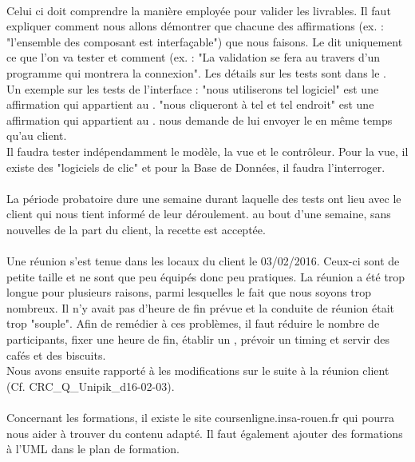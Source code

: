 \documentclass [a4paper] {article}
\begin{document}
\paragraph{}
Celui ci doit comprendre la manière employée pour valider les livrables. Il faut expliquer comment nous allons démontrer que chacune des affirmations (ex. : "l'ensemble des composant est interfaçable") que nous faisons. Le \PTVCourt{} dit uniquement ce que l'on va tester et comment (ex. : "La validation se fera au travers d'un programme qui montrera la connexion". Les détails sur les tests sont dans le \CDR{}.
\\
Un exemple sur les tests de l'interface : "nous utiliserons tel logiciel" est une affirmation qui appartient au \PTVCourt{}. "nous cliqueront à tel et tel endroit" est une affirmation qui appartient au \CDR{}. \nomTuteurPedago{} nous demande de lui envoyer le \PTV{} en même temps qu'au client.
\\
Il faudra tester indépendamment le modèle, la vue et le contrôleur. Pour la vue, il existe des "logiciels de clic" et pour la Base de Données, il faudra l'interroger.
\paragraph{}
La période probatoire dure une semaine durant laquelle des tests ont lieu avec le client qui nous tient informé de leur déroulement. au bout d'une semaine, sans nouvelles de la part du client, la recette est acceptée.
\paragraph{}
Une réunion s'est tenue dans les locaux du client le 03/02/2016. Ceux-ci sont de petite taille et ne sont que peu équipés donc peu pratiques. La réunion a été trop longue pour plusieurs raisons, parmi lesquelles le fait que nous soyons trop nombreux. Il n'y avait pas d'heure de fin prévue et la conduite de réunion était trop "souple". Afin de remédier à ces problèmes, il faut réduire le nombre de participants, fixer une heure de fin, établir un \OJ{}, prévoir un timing et servir des cafés et des biscuits.
\\
Nous avons ensuite rapporté à \nomTuteurPedago{} les modifications sur le \CDC{} suite à la réunion client (Cf. CRC_Q_Unipik_d16-02-03).
\paragraph{}
Concernant les formations, il existe le site coursenligne.insa-rouen.fr qui pourra nous aider à trouver du contenu adapté. Il faut également ajouter des formations à l'UML dans le plan de formation.
\end{document}
